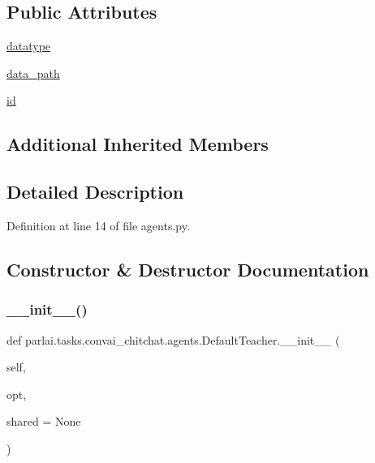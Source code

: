 \subsection*{Public Attributes}
\begin{DoxyCompactItemize}
\item 
\hyperlink{classparlai_1_1tasks_1_1convai__chitchat_1_1agents_1_1DefaultTeacher_a9f90247eb9b5fead9e02ef7e50cc8f37}{datatype}
\item 
\hyperlink{classparlai_1_1tasks_1_1convai__chitchat_1_1agents_1_1DefaultTeacher_a2a216c4d5a2499f39da072f8e8afc44d}{data\+\_\+path}
\item 
\hyperlink{classparlai_1_1tasks_1_1convai__chitchat_1_1agents_1_1DefaultTeacher_acb9a1323c173edc4c95653fcb013fd8e}{id}
\end{DoxyCompactItemize}
\subsection*{Additional Inherited Members}


\subsection{Detailed Description}


Definition at line 14 of file agents.\+py.



\subsection{Constructor \& Destructor Documentation}
\mbox{\label{classparlai_1_1tasks_1_1convai__chitchat_1_1agents_1_1DefaultTeacher_a67bf5351429e9cb7b94534211a2a6978}} 
\subsubsection{\texorpdfstring{\+\_\+\+\_\+init\+\_\+\+\_\+()}{\_\_init\_\_()}}
{\footnotesize\ttfamily def parlai.\+tasks.\+convai\+\_\+chitchat.\+agents.\+Default\+Teacher.\+\_\+\+\_\+init\+\_\+\+\_\+ (\begin{DoxyParamCaption}\item[{}]{self,  }\item[{}]{opt,  }\item[{}]{shared = {\ttfamily None} }\end{DoxyParamCaption})}



